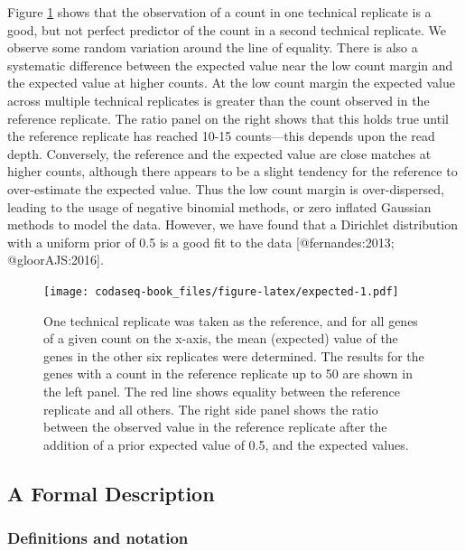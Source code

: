 \documentclass[
  onecolumn]{article}
\begin{document}
Figure \ref{fig:expected} shows that the observation of a count in one technical replicate is a good, but not perfect predictor of the count in a second technical replicate. We observe some random variation around the line of equality. There is also a systematic difference between the expected value near the low count margin and the expected value at higher counts. At the low count margin the expected value across multiple technical replicates is greater than the count observed in the reference replicate. The ratio panel on the right shows that this holds true until the reference replicate has reached 10-15 counts---this depends upon the read depth. Conversely, the reference and the expected value are close matches at higher counts, although there appears to be a slight tendency for the reference to over-estimate the expected value. Thus the low count margin is over-dispersed, leading to the usage of negative binomial methods, or zero inflated Gaussian methods to model the data. However, we have found that a Dirichlet distribution with a uniform prior of 0.5 is a good fit to the data {[}@fernandes:2013; @gloorAJS:2016{]}.

\begin{figure}
\centering
\texttt{[image: codaseq-book\_files/figure-latex/expected-1.pdf]}
\caption{\label{fig:expected}One technical replicate was taken as the reference, and for all genes of a given count on the x-axis, the mean (expected) value of the genes in the other six replicates were determined. The results for the genes with a count in the reference replicate up to 50 are shown in the left panel. The red line shows equality between the reference replicate and all others. The right side panel shows the ratio between the observed value in the reference replicate after the addition of a prior expected value of 0.5, and the expected values.}
\end{figure}

\hypertarget{a-formal-description}{%
\subsection{A Formal Description}\label{a-formal-description}}

\hypertarget{definitions-and-notation}{%
\subsubsection{Definitions and notation}\label{definitions-and-notation}}
\end{document}
